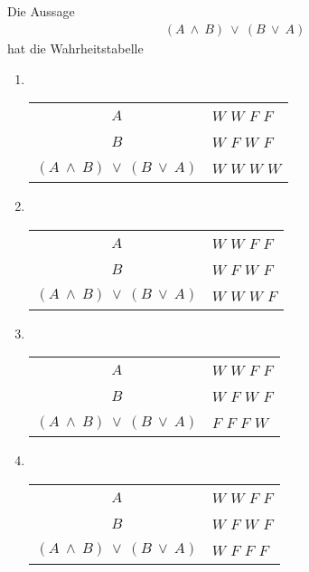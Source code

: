 \subsection*{}
Die Aussage
\begin{align*}
(A \ \wedge \ B) \ \vee \ (B \ \vee \ A)
\end{align*}
hat die Wahrheitstabelle
\renewcommand{\labelenumi}{(\alph{enumi})}
\begin{enumerate}
\item 
\ 
\ 
\
\
\
\begin{tabular}{cllll}
\hline
\multicolumn{1}{c|}{$A$} & \multicolumn{4}{l}{$W$ $W$ $F$ $F$} \\
\multicolumn{1}{c|}{$B$} & \multicolumn{4}{l}{$W$ $F$ $W$ $F$} \\ \hline
\multicolumn{1}{c|}{$(A \ \wedge \ B) \ \vee \ (B \ \vee \ A)$} & \multicolumn{4}{l}{$W$ $W$ $W$ $W$}  \\ \hline
\end{tabular}


\item
\ 
\ 
\
\
\
\begin{tabular}{cllll}
\hline
\multicolumn{1}{c|}{$A$} & \multicolumn{4}{l}{$W$ $W$ $F$ $F$} \\
\multicolumn{1}{c|}{$B$} & \multicolumn{4}{l}{$W$ $F$ $W$ $F$} \\ \hline
\multicolumn{1}{c|}{$(A \ \wedge \ B) \ \vee \ (B \ \vee \ A)$} & \multicolumn{4}{l}{$W$ $W$ $W$ $F$}  \\ \hline
\end{tabular} 
\item
\ 
\ 
\
\
\
\begin{tabular}{cllll}
\hline
\multicolumn{1}{c|}{$A$} & \multicolumn{4}{l}{$W$ $W$ $F$ $F$} \\
\multicolumn{1}{c|}{$B$} & \multicolumn{4}{l}{$W$ $F$ $W$ $F$} \\ \hline
\multicolumn{1}{c|}{$(A \ \wedge \ B) \ \vee \ (B \ \vee \ A)$} & \multicolumn{4}{l}{$F$ $F$ $F$ $W$}  \\ \hline
\end{tabular} 
\item 
\ 
\ 
\
\
\
\begin{tabular}{cllll}
\hline
\multicolumn{1}{c|}{$A$} & \multicolumn{4}{l}{$W$ $W$ $F$ $F$} \\
\multicolumn{1}{c|}{$B$} & \multicolumn{4}{l}{$W$ $F$ $W$ $F$} \\ \hline
\multicolumn{1}{c|}{$(A \ \wedge \ B) \ \vee \ (B \ \vee \ A)$} & \multicolumn{4}{l}{$W$ $F$ $F$ $F$}  \\ \hline
\end{tabular}
\end{enumerate}
\ \\
\\
